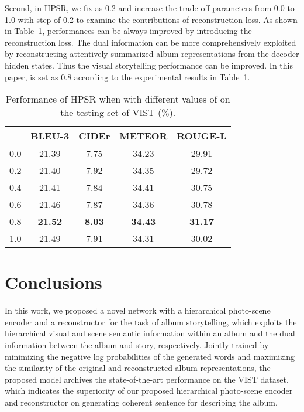 \documentclass[letterpaper]{article} \usepackage{aaai19}  \usepackage{times}  \usepackage{helvet}  \usepackage{courier}  \usepackage{url}  \usepackage{graphicx}  \usepackage{color}
\begin{document}
Second, in HPSR, we fix  as 0.2 and increase the trade-off parameters  from 0.0 to 1.0 with step of 0.2 to examine the contributions of reconstruction loss.
As shown in Table~\ref{table:results_mu}, performances can be always improved by introducing the reconstruction loss.
The dual information can be more comprehensively exploited by reconstructing attentively summarized album representations from the decoder hidden states. Thus the visual storytelling performance can be improved.
In this paper,  is set as 0.8 according to the experimental results in Table~\ref{table:results_mu}.

\begin{table}[h]
\begin{center}
\caption{Performance of HPSR when  with different values of  on the testing set of VIST (\%). }
\label{table:results_mu}
\begin{adjustbox}{width=0.345\textwidth}
\begin{tabular}{c|c|c|c|c}
\hline
    & BLEU-3 & CIDEr & METEOR  & ROUGE-L \\ \hline
0.0   &21.39 &7.75 &34.23 &29.91 \\
0.2   &21.40 &7.92 &34.35 &29.72 \\
0.4   &21.41 &7.84 &34.41 &30.75 \\
0.6  &21.46 &7.87 &34.36 &30.78 \\
0.8  &\textbf{21.52} &\textbf{8.03} &\textbf{34.43} &\textbf{31.17} \\
1.0  &21.49 &7.91 &34.31 &30.02 \\
\hline
\end{tabular}
\end{adjustbox}
\end{center}
\end{table}

















\section{Conclusions}
In this work, we proposed a novel network with a hierarchical photo-scene encoder and a reconstructor for the task of album storytelling, which exploits the hierarchical visual and scene semantic information within an album and the dual information between the album and story, respectively.
Jointly trained by minimizing the negative log probabilities of the generated words and maximizing the similarity of the original and reconstructed album representations, the proposed model archives the state-of-the-art performance on the VIST dataset, which indicates the superiority of our proposed hierarchical photo-scene encoder and reconstructor on generating coherent sentence for describing the album.
\end{document}
